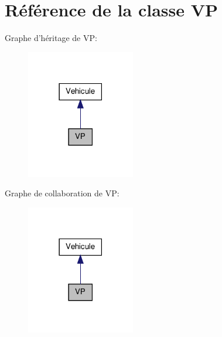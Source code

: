 \hypertarget{class_v_p}{
\section{Référence de la classe VP}
\label{class_v_p}
}


Graphe d'héritage de VP:\nopagebreak
\begin{figure}[H]
\begin{center}
\leavevmode
\includegraphics[width=134pt]{class_v_p__inherit__graph}
\end{center}
\end{figure}


Graphe de collaboration de VP:\nopagebreak
\begin{figure}[H]
\begin{center}
\leavevmode
\includegraphics[width=134pt]{class_v_p__coll__graph}
\end{center}
\end{figure}
